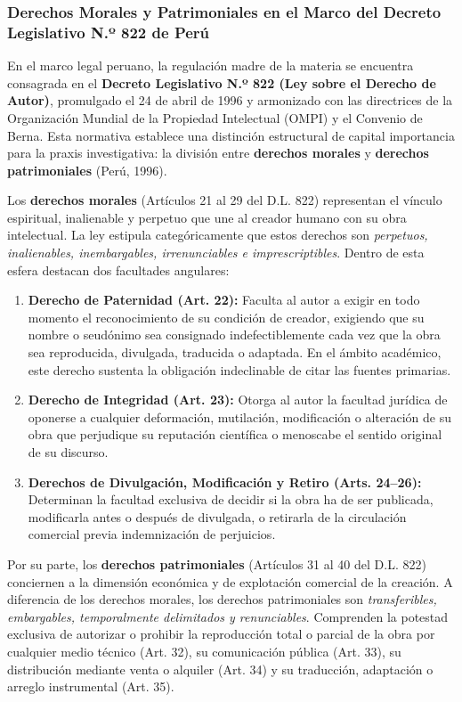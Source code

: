 \subsubsection{Derechos Morales y Patrimoniales en el Marco del Decreto Legislativo N.º 822 de Perú}

En el marco legal peruano, la regulación madre de la materia se encuentra consagrada en el \textbf{Decreto Legislativo N.º 822 (Ley sobre el Derecho de Autor)}, promulgado el 24 de abril de 1996 y armonizado con las directrices de la Organización Mundial de la Propiedad Intelectual (OMPI) y el Convenio de Berna. Esta normativa establece una distinción estructural de capital importancia para la praxis investigativa: la división entre \textbf{derechos morales} y \textbf{derechos patrimoniales} (Perú, 1996).

Los \textbf{derechos morales} (Artículos 21 al 29 del D.L. 822) representan el vínculo espiritual, inalienable y perpetuo que une al creador humano con su obra intelectual. La ley estipula categóricamente que estos derechos son \textit{perpetuos, inalienables, inembargables, irrenunciables e imprescriptibles}. Dentro de esta esfera destacan dos facultades angulares:
\begin{enumerate}
    \item \textbf{Derecho de Paternidad (Art. 22):} Faculta al autor a exigir en todo momento el reconocimiento de su condición de creador, exigiendo que su nombre o seudónimo sea consignado indefectiblemente cada vez que la obra sea reproducida, divulgada, traducida o adaptada. En el ámbito académico, este derecho sustenta la obligación indeclinable de citar las fuentes primarias.
    \item \textbf{Derecho de Integridad (Art. 23):} Otorga al autor la facultad jurídica de oponerse a cualquier deformación, mutilación, modificación o alteración de su obra que perjudique su reputación científica o menoscabe el sentido original de su discurso.
    \item \textbf{Derechos de Divulgación, Modificación y Retiro (Arts. 24--26):} Determinan la facultad exclusiva de decidir si la obra ha de ser publicada, modificarla antes o después de divulgada, o retirarla de la circulación comercial previa indemnización de perjuicios.
\end{enumerate}

Por su parte, los \textbf{derechos patrimoniales} (Artículos 31 al 40 del D.L. 822) conciernen a la dimensión económica y de explotación comercial de la creación. A diferencia de los derechos morales, los derechos patrimoniales son \textit{transferibles, embargables, temporalmente delimitados y renunciables}. Comprenden la potestad exclusiva de autorizar o prohibir la reproducción total o parcial de la obra por cualquier medio técnico (Art. 32), su comunicación pública (Art. 33), su distribución mediante venta o alquiler (Art. 34) y su traducción, adaptación o arreglo instrumental (Art. 35).


